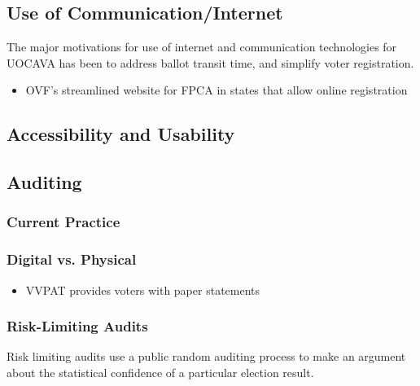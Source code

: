 \subsection{Use of Communication/Internet}

The major motivations for use of internet and communication technologies for UOCAVA has been to address ballot transit time, and simplify voter registration. 
\begin{itemize}
\item OVF's streamlined website for FPCA in states that allow online registration
\end{itemize}

\subsection{Accessibility and Usability}
\subsection{Auditing}
\subsubsection{Current Practice}
\subsubsection{Digital vs. Physical}
\begin{itemize}
\item VVPAT provides voters with paper statements
\end{itemize}
\subsubsection{Risk-Limiting Audits}
Risk limiting audits use a public random auditing process to make an argument about the statistical confidence of a particular election result.
